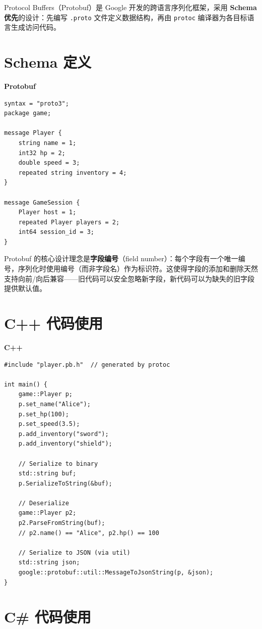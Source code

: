 \documentclass[12pt,a4paper,fontset=fandol]{ctexbook}
\newcommand{\cpplabel}{%
  \noindent\begin{tcolorbox}[colback=algheadbg,coltext=white,
    sharp corners,boxrule=0pt,width=3.0em,height=1.4em,
    halign=center,valign=center,nobeforeafter,left=0pt,right=0pt,
    top=0pt,bottom=0pt]\small\bfseries C++\end{tcolorbox}}
\newcommand{\protolabel}{%
  \noindent\begin{tcolorbox}[colback=protoheadbg,coltext=white,
    sharp corners,boxrule=0pt,width=5em,height=1.4em,
    halign=center,valign=center,nobeforeafter,left=0pt,right=0pt,
    top=0pt,bottom=0pt]\small\bfseries Protobuf\end{tcolorbox}}
\begin{document}
Protocol Buffers（Protobuf）是 Google 开发的跨语言序列化框架，采用 \textbf{Schema 优先}的设计：先编写 \texttt{.proto} 文件定义数据结构，再由 \texttt{protoc} 编译器为各目标语言生成访问代码。

\section{Schema 定义}\label{sec:proto-schema}

\protolabel
\begin{lstlisting}[style=protostyle,caption={Protocol Buffers: .proto Schema 定义}]
syntax = "proto3";
package game;

message Player {
    string name = 1;
    int32 hp = 2;
    double speed = 3;
    repeated string inventory = 4;
}

message GameSession {
    Player host = 1;
    repeated Player players = 2;
    int64 session_id = 3;
}
\end{lstlisting}

Protobuf 的核心设计理念是\textbf{字段编号}（field number）：每个字段有一个唯一编号，序列化时使用编号（而非字段名）作为标识符。这使得字段的添加和删除天然支持向前/向后兼容——旧代码可以安全忽略新字段，新代码可以为缺失的旧字段提供默认值。

\section{C++ 代码使用}\label{sec:proto-cpp}

\cpplabel
\begin{lstlisting}[caption={Protocol Buffers: C++ 使用生成的代码}]
#include "player.pb.h"  // generated by protoc

int main() {
    game::Player p;
    p.set_name("Alice");
    p.set_hp(100);
    p.set_speed(3.5);
    p.add_inventory("sword");
    p.add_inventory("shield");

    // Serialize to binary
    std::string buf;
    p.SerializeToString(&buf);

    // Deserialize
    game::Player p2;
    p2.ParseFromString(buf);
    // p2.name() == "Alice", p2.hp() == 100

    // Serialize to JSON (via util)
    std::string json;
    google::protobuf::util::MessageToJsonString(p, &json);
}
\end{lstlisting}

\section{C\# 代码使用}\label{sec:proto-csharp}
\end{document}
